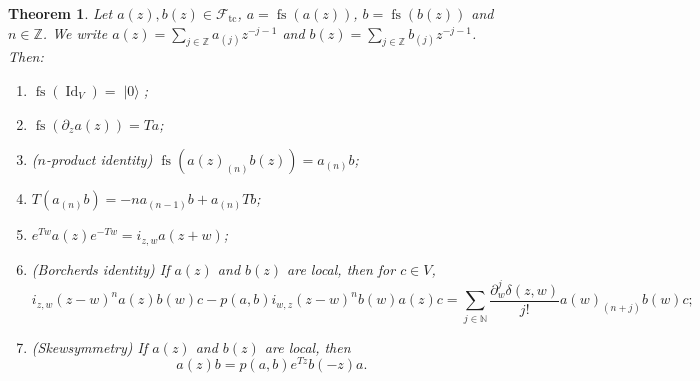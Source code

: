 \documentclass[a4paper, 12pt, reqno]{amsart}
\newtheorem{theorem}{Theorem}[section]
\theoremstyle{remark}
\numberwithin{equation}{subsection}
\DeclareMathOperator{\Id}{Id}
\DeclareMathOperator{\vac}{|0\rangle}
\DeclareMathOperator{\fs}{fs}
\DeclareMathOperator{\tc}{tc}
\begin{document}
\begin{theorem}
  \label{thr:15}
  Let $a(z), b(z) \in \mathcal{F}_{\tc}$, $a = \fs(a(z))$, $b = \fs(b(z))$ and $n \in \mathbb{Z}$.
  We write $a(z) = \sum_{j \in \mathbb{Z}}a_{(j)}z^{-j - 1}$ and $b(z) = \sum_{j \in \mathbb{Z}}b_{(j)}z^{-j - 1}$.
  Then:
  \begin{enumerate}
  \item $\fs(\Id_V) = \vac$;
  \item $\fs(\partial_za(z)) = Ta$;
  \item \emph{($n$-product identity)} $\fs(a(z)_{(n)}b(z)) = a_{(n)}b$;
  \item $T(a_{(n)}b) = -na_{(n - 1)}b + a_{(n)}Tb$;
  \item $e^{Tw}a(z)e^{-Tw} = i_{z, w}a(z + w)$;
  \item \emph{(Borcherds identity)} If $a(z)$ and $b(z)$ are local, then for $c \in V$,
    \begin{equation*}
      i_{z, w}(z - w)^na(z)b(w)c - p(a, b)i_{w, z}(z - w)^nb(w)a(z)c = \sum_{j \in \mathbb{N}}\frac{\partial^j_w\delta(z, w)}{j!}a(w)_{(n + j)}b(w)c;
    \end{equation*}
  \item \emph{(Skewsymmetry)} If $a(z)$ and $b(z)$ are local, then
    \begin{equation*}
      a(z)b = p(a, b)e^{Tz}b(-z)a.
    \end{equation*}
  \end{enumerate}
\end{theorem}
\end{document}
